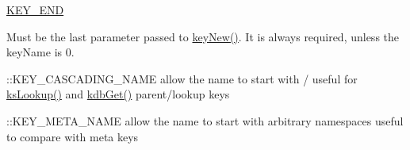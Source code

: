 \begin{DoxyItemize}
\item \hyperlink{group__key_gga91fb3178848bd682000958089abbaf40aa8adb6fcb92dec58fb19410eacfdd403}{K\-E\-Y\-\_\-\-E\-N\-D} \par
 Must be the last parameter passed to \hyperlink{group__key_gad23c65b44bf48d773759e1f9a4d43b89}{key\-New()}. It is always required, unless the {\ttfamily key\-Name} is 0.
\item \-::\-K\-E\-Y\-\_\-\-C\-A\-S\-C\-A\-D\-I\-N\-G\-\_\-\-N\-A\-M\-E allow the name to start with / useful for \hyperlink{group__keyset_gaa34fc43a081e6b01e4120daa6c112004}{ks\-Lookup()} and \hyperlink{group__kdb_ga28e385fd9cb7ccfe0b2f1ed2f62453a1}{kdb\-Get()} parent/lookup keys
\item \-::\-K\-E\-Y\-\_\-\-M\-E\-T\-A\-\_\-\-N\-A\-M\-E allow the name to start with arbitrary namespaces useful to compare with meta keys
\end{DoxyItemize}


